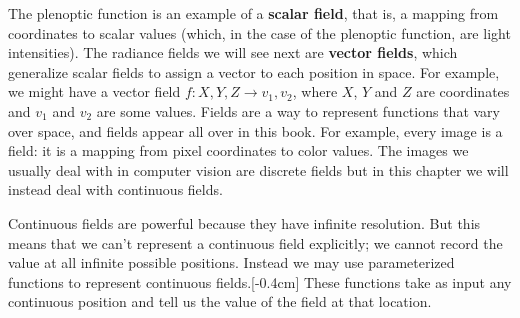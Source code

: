 The plenoptic function is an example of a \textbf{scalar field}, that is, a mapping from coordinates to scalar values (which, in the case of the plenoptic function, are light intensities). The radiance fields we will see next are \textbf{vector fields}, which generalize scalar fields to assign a vector to each position in space. For example, we might have a vector field $f: X, Y, Z \rightarrow v_1, v_2$, where $X$, $Y$ and $Z$ are coordinates and $v_1$ and $v_2$ are some values. Fields are a way to represent functions that vary over space, and fields appear all over in this book. For example, every image is a field: it is a mapping from pixel coordinates to color values. The images we usually deal with in computer vision are discrete fields but in this chapter we will instead deal with continuous fields.

Continuous fields are powerful because they have infinite resolution. But this means that we can't represent a continuous field explicitly; we cannot record the value at all infinite possible positions. Instead we may use parameterized functions to represent continuous fields.[-0.4cm] These functions take as input any continuous position and tell us the value of the field at that location.

